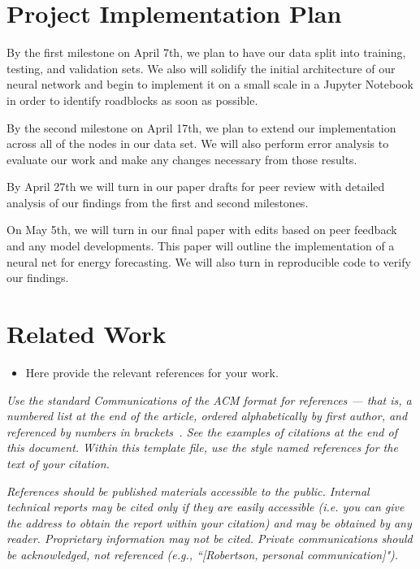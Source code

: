 \documentclass[sigconf]{acmart}
\begin{document}
\section{Project Implementation Plan}
By the first milestone on April 7th, we plan to have our data split into training, testing, and validation sets. We also will solidify the initial architecture of our neural network and begin to implement it on a small scale in a Jupyter Notebook in order to identify roadblocks as soon as possible. 

By the second milestone on April 17th, we plan to extend our implementation across all of the nodes in our data set. We will also perform error analysis to evaluate our work and make any changes necessary from those results. 

By April 27th we will turn in our paper drafts for peer review with detailed analysis of our findings from the first and second milestones.

On May 5th, we will turn in our final paper with edits based on peer feedback and any model developments. This paper will outline the implementation of a neural net for energy forecasting. We will also turn in reproducible code to verify our findings. 


\section{Related Work}
\begin{itemize}
    \item Here provide the relevant references for your work. 
\end{itemize}
	
\emph{Use the standard Communications of the ACM format for references --- that is, a numbered list at the end of the article, ordered alphabetically by first author, and referenced by numbers in brackets~. See the examples of citations at the end of this document. Within this template file, use the style named references for the text of your citation.}

\emph{References should be published materials accessible to the public. Internal technical reports may be cited only if they are easily accessible (i.e. you can give the address to obtain the report within your citation) and may be obtained by any reader. Proprietary information may not be cited. Private communications should be acknowledged, not referenced  (e.g., ``[Robertson, personal communication]").}



%

\end{document}
